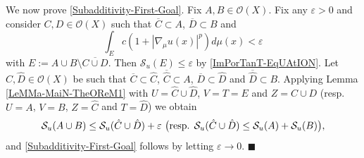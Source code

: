 \documentclass[10pt]{amsart}
\numberwithin{equation}{section}
\theoremstyle{definition}
\theoremstyle{remark}
\begin{document}
\medskip

We now prove \eqref{Subadditivity-First-Goal}. Fix $A,B\in\mathcal{O}(X)$. Fix any ${\varepsilon}>0$ and consider $C,D\in\mathcal{O}(X)$ such that $\overline{C}\subset A$, $\overline{D}\subset B$ and 
$$
\int_Ec(1+|\nabla_\mu u(x)|^p)d\mu(x)<{\varepsilon}
$$ 
with $E:=A\cup B\setminus\overline{C\cup D}$. Then $\mathcal{S}_u(E)\leq{\varepsilon}$ by \eqref{ImPorTanT-EqUAtION}. Let $\hat C,\hat D\in\mathcal{O}(X)$ be such that $\overline{C}\subset\hat C$, $\overline{\hat C}\subset A$, $\overline{D}\subset\hat D$ and $\overline{\hat D}\subset B$. Applying Lemma \ref{LeMMa-MaiN-TheOReM1} with $U=\hat C\cup\hat D$, $V=T=E$ and $Z=C\cup D$ (resp. $U=A$, $V=B$, $Z=\hat C$ and $T=\hat D$) we obtain
$$
\mathcal{S}_u(A\cup B)\leq\mathcal{S}_u(\hat C\cup\hat D)+{\varepsilon}\hbox{ \big(resp. }\mathcal{S}_u(\hat C\cup\hat D)\leq\mathcal{S}_u(A)+\mathcal{S}_u(B)\big),
$$
and \eqref{Subadditivity-First-Goal} follows by letting ${\varepsilon}\to0$. $\blacksquare$
\end{document}
